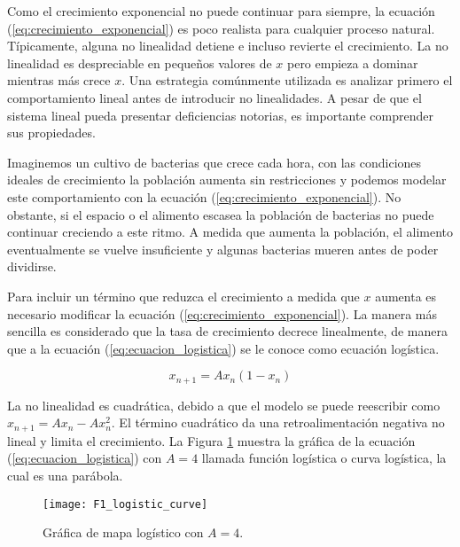         Como el crecimiento exponencial no puede continuar para siempre, la ecuación (\ref{eq:crecimiento_exponencial}) es poco realista para cualquier proceso natural. Típicamente, alguna no linealidad detiene e incluso revierte el crecimiento. La no linealidad es despreciable en pequeños valores de $x$ pero empieza a dominar mientras más crece $x$. Una estrategia comúnmente utilizada es analizar primero el comportamiento lineal antes de introducir no linealidades. A pesar de que el sistema lineal pueda presentar deficiencias notorias, es importante comprender sus propiedades. 

        Imaginemos un cultivo de bacterias que crece cada hora, con las condiciones ideales de crecimiento la población aumenta sin restricciones y podemos modelar este comportamiento con la ecuación (\ref{eq:crecimiento_exponencial}). No obstante, si el espacio o el alimento escasea la población de bacterias no puede continuar creciendo a este ritmo. A medida que aumenta la población, el alimento eventualmente se vuelve insuficiente y algunas bacterias mueren antes de poder dividirse. 

        Para incluir un término que reduzca el crecimiento a medida que $x$ aumenta es necesario modificar la ecuación (\ref{eq:crecimiento_exponencial}). La manera más sencilla es considerado que la tasa de crecimiento decrece linealmente, de manera que a la ecuación (\ref{eq:ecuacion_logistica}) se le conoce como ecuación logística.
            
       \begin{equation}
            x_{n+1} = A x_{n} (1 - x_{n}) 
            \label{eq:ecuacion_logistica}
       \end{equation}

       La no linealidad es cuadrática, debido a que el modelo se puede reescribir como $x_{n+1} = A x_{n} - A x_{n}^{2}$. El término cuadrático da una retroalimentación negativa no lineal y limita el crecimiento. La Figura \ref{fig:F1_logistic_curve} muestra la gráfica de la ecuación (\ref{eq:ecuacion_logistica}) con $A = 4$ llamada función logística o curva logística, la cual es una parábola.

        \begin{figure}[hbtp]
            \caption{Gráfica de mapa logístico con $A = 4$.}
            \centering
            \texttt{[image: F1\_logistic\_curve]}
            \label{fig:F1_logistic_curve}
        \end{figure}

